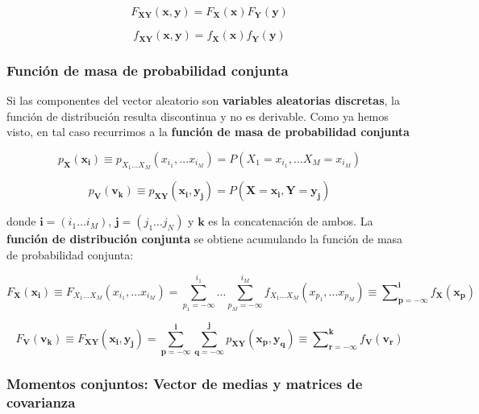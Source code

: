 \documentclass[11pt]{article}
\begin{document}
\[
F_{\mathbf{XY}}(\mathbf{x},\mathbf{y}) = F_{\mathbf{X}}(\mathbf{x}) F_{\mathbf{Y}}(\mathbf{y})
\]

\[
f_{\mathbf{XY}}(\mathbf{x},\mathbf{y}) = f_{\mathbf{X}}(\mathbf{x}) f_{\mathbf{Y}}(\mathbf{y})
\]

    \hypertarget{funciuxf3n-de-masa-de-probabilidad-conjunta}{%
\subsubsection{Función de masa de probabilidad
conjunta}\label{funciuxf3n-de-masa-de-probabilidad-conjunta}}

Si las componentes del vector aleatorio son \textbf{variables aleatorias
discretas}, la función de distribución resulta discontinua y no es
derivable. Como ya hemos visto, en tal caso recurrimos a la
\textbf{función de masa de probabilidad conjunta}

\[
p_{\mathbf{X}}(\mathbf{x_i}) \equiv p_{X_1 \ldots X_M}(x_{i_1}, \ldots x_{i_M}) = P(X_1 = x_{i_1} , \ldots X_M = x_{i_M})
\]

\[
p_{\mathbf{V}}(\mathbf{v_{k}}) \equiv p_{\mathbf{X} \mathbf{Y}}(\mathbf{x_{i}}, \mathbf{y_{j}}) = P(\mathbf{X} = \mathbf{x_{i}} , \mathbf{Y} = \mathbf{y_{j}})
\]

donde \(\mathbf{i} =(i_1 \ldots i_M)\), \(\mathbf{j} =(j_1 \ldots j_N)\)
y \(\mathbf{k}\) es la concatenación de ambos. La \textbf{función de
distribución conjunta} se obtiene acumulando la función de masa de
probabilidad conjunta:

\[
F_\mathbf{X}(\mathbf{x_i}) \equiv F_{X_1\ldots X_M}(x_{i_1},\ldots x_{i_M}) = \sum_{p_1=-\infty}^{i_1} \ldots \sum_{p_M=-\infty}^{i_M} f_{X_1\ldots X_M}(x_{p_1},\ldots x_{p_M}) \equiv 
\boldsymbol{\sum}_{\mathbf{p}=\boldsymbol{-\infty}}^{\mathbf{i}} f_\mathbf{X}(\mathbf{x_p}) 
\]

\[
F_\mathbf{V}(\mathbf{v_k}) \equiv F_{\mathbf{X} \mathbf{Y}}(\mathbf{x_i},\mathbf{y_j}) = \sum_{\mathbf{p}=-\boldsymbol{\infty}}^{\mathbf{i}}\sum_{\mathbf{q}=-\boldsymbol{\infty}}^{\mathbf{j}} p_{\mathbf{X}\mathbf{Y}}(\mathbf{x_p},\mathbf{y_q}) \equiv 
\boldsymbol{\sum}_{\mathbf{r}=\boldsymbol{-\infty}}^{\mathbf{k}} f_\mathbf{V}(\mathbf{v_r}) 
\]

    \hypertarget{momentos-conjuntos-vector-de-medias-y-matrices-de-covarianza}{%
\subsubsection{Momentos conjuntos: Vector de medias y matrices de
covarianza}\label{momentos-conjuntos-vector-de-medias-y-matrices-de-covarianza}}
\end{document}
